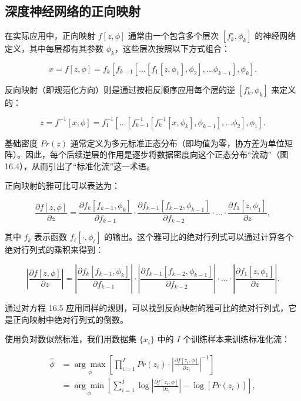 \subsection{深度神经网络的正向映射}
在实际应用中，正向映射 \(f[z, \phi]\) 通常由一个包含多个层次 \([f_k^{\circ}, \phi_k]\) 的神经网络定义，其中每层都有其参数 \(\phi_k\)，这些层次按照以下方式组合：

\[
x = f[z, \phi] = f_k \left[ f_{k-1} \left[ ... \left[ f_1[z, \phi_1], \phi_2 \right], ... \phi_{k-1} \right], \phi_k \right]. \tag{16.4}
\]

反向映射（即规范化方向）则是通过按相反顺序应用每个层的逆 \([f_k^{\circ}, \phi_k]\) 来定义的：

\[
z = f^{-1}[x, \phi] = f_1^{-1} \left[ ... \left[ f_{k-1}^{-1} \left[ f_k^{-1}[x, \phi_k], \phi_{k-1} \right], ... \phi_2 \right], \phi_1 \right]. \tag{16.5}
\]

基础密度 \(Pr(z)\) 通常定义为多元标准正态分布（即均值为零，协方差为单位矩阵）。因此，每个后续逆层的作用是逐步将数据密度向这个正态分布“流动”（图 16.4），从而引出了“标准化流”这一术语。

正向映射的雅可比可以表达为：

\[
\frac{\partial f[z, \phi]}{\partial z} = \frac{\partial f_k[f_{k-1}, \phi_k]}{\partial f_{k-1}} \cdot \frac{\partial f_{k-1}[f_{k-2}, \phi_{k-1}]}{\partial f_{k-2}} \cdot ... \cdot \frac{\partial f_1[z, \phi_1]}{\partial z}, \tag{16.6}
\]

其中 \(f_k\) 表示函数 \(f_{\ell}[\cdot, \phi_{\ell}]\) 的输出。这个雅可比的绝对行列式可以通过计算各个绝对行列式的乘积来得到：

\[
\left| \frac{\partial f[z, \phi]}{\partial z} \right| = \left| \frac{\partial f_k[f_{k-1}, \phi_k]}{\partial f_{k-1}} \right| \cdot \left| \frac{\partial f_{k-1}[f_{k-2}, \phi_{k-1}]}{\partial f_{k-2}} \right| \cdot ... \cdot \left| \frac{\partial f_1[z, \phi_1]}{\partial z} \right|. \tag{16.7}
\]

通过对方程 16.5 应用同样的规则，可以找到反向映射的雅可比的绝对行列式，它是正向映射中绝对行列式的倒数。

使用负对数似然标准，我们用数据集 \(\{x_i\}\) 中的 \(I\) 个训练样本来训练标准化流：


\begin{align}
\hat{\phi} &= \underset{\phi}{\arg\max} \left[ \prod_{i=1}^I Pr(z_i) \cdot \left| \frac{\partial f[z_i, \phi]}{\partial z_i} \right|^{-1} \right] \\
&= \underset{\phi}{\arg\min} \left[ \sum_{i=1}^I \log \left| \frac{\partial f[z_i, \phi]}{\partial z_i} \right| - \log[Pr(z_i)] \right],
\end{align} 


